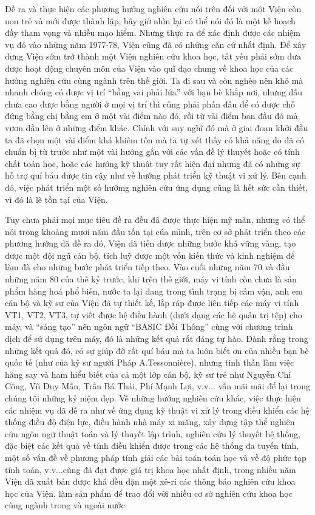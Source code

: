             Đề ra và thực hiện các phương hướng nghiên cứu nói trên đối với một Viện còn non trẻ và mới được thành lập, bây giờ nhìn lại có thể nói đó là một kế hoạch đầy tham vọng và nhiều mạo hiểm. Nhưng thực ra để xác định được các nhiệm vụ đó vào những năm 1977-78, Viện cũng đã có những căn cứ nhất định. Để xây dựng Viện sớm trở thành một Viện nghiên cứu khoa học, tất yếu phải sớm đưa được hoạt động chuyên môn của Viện vào quĩ đạo chung về khoa học của các hướng nghiên cứu cùng ngành trên thế giới. Ta đi sau và còn nghèo nên khó mà nhanh chóng có được vị trí “bằng vai phải lứa” với bạn bè khắp nơi, nhưng dẫu chưa cao được bằng người ở mọi vị trí thì cũng phải phấn đấu để có được chỗ đứng bằng chị bằng em ở một vài điểm nào đó, rồi từ vài điểm ban đầu đó mà vươn dần lên ở những điểm khác.  Chính với suy nghĩ đó mà ở giai đoạn khởi đầu ta đã chọn một vài điểm khá khiêm tốn  mà ta tự xét thấy có khả năng do đã có chuẩn bị từ trước như một vài hướng gắn với các vấn đề lý thuyết hoặc có tính chất toán học, hoặc các hướng kỹ thuật tuy rất hiện đại nhưng đã có những sự hỗ trợ quí báu được tin cậy như về hướng phát triển kỹ thuật vi xử lý. Bên cạnh đó, việc phát triển một số hướmg nghiên cứu ứng dụng cũng là hết sức cần thiết, vì đó là lẽ tồn tại của Viện.
            
            Tuy chưa phải mọi mục tiêu đề ra đều đã được thực hiện mỹ mãn, nhưng có thể nói trong khoảng mươi năm đầu tốn tại của mình, trên cơ sở phát triển theo các phương hướng đã đề ra đó, Viện đã tiến được những bước khá vững vàng, tạo được một đội ngũ cán bộ, tích luỹ được một vốn kiến thức và kinh nghiệm để làm đà cho những bước phát triển tiếp theo. Vào cuối những năm 70 và đầu những năm 80 của thế kỷ trước, khi trên thế giới, máy vi tính còn chưa là sản phẩm hàng hoá phổ biến, nước ta lại đang trong tình trạng bị cấm vận, anh em cán bộ và kỹ sư của Viện đã tự thiết kế, lắp ráp được liên tiếp các máy vi tính VT1, VT2, VT3, tự  viết được hệ điều hành (dưới dạng các hệ quản trị tệp) cho máy, và “sáng tạo” nên ngôn ngữ “BASIC Đồi Thông” cùng với chương trình dịch để sử dụng trên máy, đó là những kết quả rất đáng tự hào. Đành rằng trong những kết quả đó, có sự giúp đỡ rất quí báu mà ta luôn biết ơn của nhiều bạn bè quốc tế (như của kỹ sư người Pháp A.Tessonnière), nhưng tinh thần làm việc hăng say và ham hiểu biết của cả một lớp cán bộ, kỹ sư trẻ như Nguyễn Chí Công, Vũ Duy Mẫn, Trần Bá Thái, Phí Mạnh Lợi, v.v... vẫn mãi mãi để lại trong chúng tôi những kỷ niệm đẹp. Về những hướng nghiên cứu khác, việc thực hiện các nhiệm vụ đã đề ra  như về ứng dụng kỹ thuật vi xử lý trong điều khiển các hệ thống điều độ điện lực, điều hành nhà máy xi măng, xây dựng tập thể nghiên cứu ngôn ngữ thuật toán và lý thuyết lập trình, nghiên cứu lý thuyết hệ thống, đặc biệt các kết quả về tính điều khiển được trong các hệ thống đa tuyến tính, một số vấn đề về phương pháp tính giải các bài toán toán học và về độ phức tạp tính toán, v.v...cũng đã đạt được giá trị khoa học nhất định, trong nhiều năm Viện đã xuất bản được khá đều đặn một xê-ri các thông báo nghiên cứu khoa học của Viện, làm sản phẩm để trao đổi với nhiều cơ sở nghiên cứu khoa học cùng ngành trong và ngoài nước.
            
